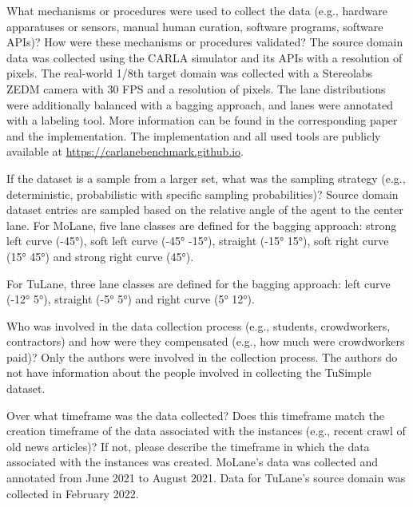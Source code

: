\documentclass{article}
\begin{document}
	\begin{datasheetitem}{What mechanisms or procedures were used to collect the data (e.g., hardware apparatuses or sensors, manual human curation, software programs, software APIs)? \normalfont How were these mechanisms or procedures validated?}
		The source domain data was collected using the CARLA simulator and its APIs with a resolution of  pixels. The real-world 1/8th target domain was collected with a Stereolabs ZEDM camera with 30 FPS and a resolution of  pixels. The lane distributions were additionally balanced with a bagging approach, and lanes were annotated with a labeling tool. More information can be found in the corresponding paper and the implementation. The implementation and all used tools are publicly available at \url{https://carlanebenchmark.github.io}.
	\end{datasheetitem}
	\begin{datasheetitem}{If the dataset is a sample from a larger set, what was the sampling strategy (e.g., deterministic, probabilistic with specific sampling probabilities)?}
		Source domain dataset entries are sampled based on the relative angle  of the agent to the center lane. For MoLane, five lane classes are defined for the bagging approach: strong left curve (\ang{-45}), soft left curve (\ang{-45}  \ang{-15}), straight (\ang{-15}  \ang{15}), soft right curve (\ang{15}  \ang{45}) and strong right curve (\ang{45}). 
		
		For TuLane, three lane classes are defined for the bagging approach: left curve (\ang{-12}  \ang{5}), straight (\ang{-5}  \ang{5}) and right curve (\ang{5}  \ang{12}). 
	\end{datasheetitem}
	\begin{datasheetitem}{Who was involved in the data collection process (e.g., students, crowdworkers, contractors) and how were they compensated (e.g., how much were crowdworkers paid)?}
		Only the authors were involved in the collection process. The authors do not have information about the people involved in collecting the TuSimple dataset.
	\end{datasheetitem}
	\begin{datasheetitem}{Over what timeframe was the data collected? \normalfont Does this timeframe match the creation timeframe of the data associated with the instances (e.g., recent crawl of old news articles)? If not, please describe the timeframe in which the data associated with the instances was created.}
		MoLane's data was collected and annotated from June 2021 to August 2021. Data for TuLane's source domain was collected in February 2022.
	\end{datasheetitem}
\end{document}
